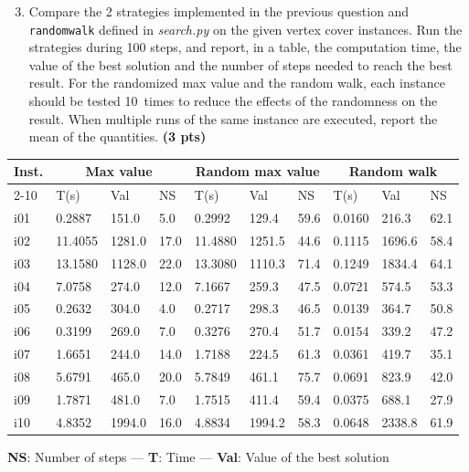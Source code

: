 \documentclass[11pt,a4paper]{report}
\begin{document}
\begin{enumerate}
\setcounter{enumi}{2}
\item Compare the 2 strategies implemented in the previous question and \texttt{randomwalk} defined in \textit{search.py} on the given vertex cover instances. 
    Run the strategies during 100 steps, and report, in a table, the computation
    time, the value of the best solution and the number of steps needed to reach the best result. For the
    randomized max value and the random walk, each instance should be tested 10~times to reduce
    the effects of the randomness on the result. When multiple runs of the same instance
    are executed, report the mean of the quantities. \textbf{(3 pts)}
\end{enumerate}

\begin{answers}[7cm]
\begin{center}
\begin{tabular}{||l||l|l|l||l|l|l||l|l|l||}
\hline
\multirow{3}{*}{Inst.} & \multicolumn{3}{c||}{Max value} & \multicolumn{3}{c||}{Random max value} & \multicolumn{3}{c||}{Random walk} \\
\cline{2-10}
\cline{2-10}
 & T(s) & Val & NS & T(s) & Val & NS & T(s) & Val & NS\\
\hline
i01 & 0.2887 & 151.0 & 5.0 & 0.2992 & 129.4 & 59.6 & 0.0160 & 216.3 & 62.1 \\
\hline
i02 & 11.4055 & 1281.0 & 17.0 & 11.4880 & 1251.5 & 44.6 & 0.1115 & 1696.6 & 58.4 \\
\hline
i03 & 13.1580 & 1128.0 & 22.0 & 13.3080 & 1110.3 & 71.4 & 0.1249 & 1834.4 & 64.1 \\
\hline
i04 & 7.0758 & 274.0 & 12.0 & 7.1667 & 259.3 & 47.5 & 0.0721 & 574.5 & 53.3 \\
\hline
i05 & 0.2632 & 304.0 & 4.0 & 0.2717 & 298.3 & 46.5 & 0.0139 & 364.7 & 50.8 \\
\hline
i06 & 0.3199 & 269.0 & 7.0 & 0.3276 & 270.4 & 51.7 & 0.0154 & 339.2 & 47.2 \\
\hline
i07 & 1.6651 & 244.0 & 14.0 & 1.7188 & 224.5 & 61.3 & 0.0361 & 419.7 & 35.1 \\
\hline
i08 & 5.6791 & 465.0 & 20.0 & 5.7849 & 461.1 & 75.7 & 0.0691 & 823.9 & 42.0 \\
\hline
i09 & 1.7871 & 481.0 & 7.0 & 1.7515 & 411.4 & 59.4 & 0.0375 & 688.1 & 27.9 \\
\hline
i10 & 4.8352 & 1994.0 & 16.0 & 4.8834 & 1994.2 & 58.3 & 0.0648 & 2338.8 & 61.9 \\
\hline
\end{tabular}
\end{center}
\textbf{NS}: Number of steps — \textbf{T}: Time — \textbf{Val}: Value of the best solution
\end{answers}
\end{document}
